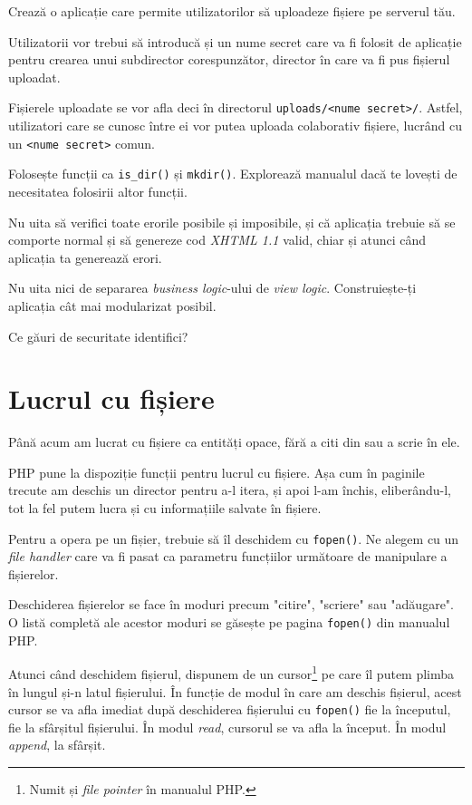 \begin{Exercise}[title={Remote file storage},difficulty=2]
\ExePart

Crează o aplicație care permite utilizatorilor să
uploadeze fișiere pe serverul tău.

Utilizatorii vor trebui să introducă și un nume secret
care va fi folosit de aplicație pentru crearea unui subdirector
corespunzător, director în care va fi pus fișierul uploadat.

Fișierele uploadate se vor afla deci în directorul
\texttt{uploads/<nume secret>/}. Astfel, utilizatori
care se cunosc între ei vor putea uploada colaborativ
fișiere, lucrând cu un \texttt{<nume secret>} comun.

Folosește funcții ca \texttt{is\_dir()} și
\texttt{mkdir()}. Explorează manualul dacă te
lovești de necesitatea folosirii altor funcții.

Nu uita să verifici toate erorile posibile și
imposibile, și că aplicația trebuie să
se comporte normal și să genereze cod \textit{XHTML 1.1} valid, chiar și atunci
când aplicația ta generează erori.

Nu uita nici de separarea \textit{business logic}-ului
de \textit{view logic}. Construiește-ți aplicația
cât mai modularizat posibil.

\ExePart
Ce găuri de securitate identifici?
\end{Exercise}

\section{Lucrul cu fișiere}
Până acum am lucrat cu fișiere ca entități opace, fără
a citi din sau a scrie în ele.

PHP pune la dispoziție funcții pentru lucrul
cu fișiere. Așa cum în paginile trecute am deschis un
director pentru a-l itera, și apoi l-am închis, eliberându-l,
tot la fel putem lucra și cu informațiile salvate în fișiere.

Pentru a opera pe un fișier, trebuie să îl deschidem cu
\texttt{fopen()}. Ne alegem cu un \textsl{file handler}
care va fi pasat ca parametru funcțiilor următoare
de manipulare a fișierelor.

Deschiderea fișierelor se face în moduri precum "citire",
"scriere" sau "adăugare". O listă completă ale acestor
moduri se găsește pe pagina \texttt{fopen()} din manualul
PHP.

Atunci când deschidem fișierul, dispunem de un cursor\footnote{Numit și
\textit{file pointer} în manualul PHP.}
pe care îl putem plimba în lungul și-n latul fișierului.
În funcție de modul în care am deschis fișierul, acest
cursor se va afla imediat după deschiderea
fișierului cu \texttt{fopen()} fie la începutul, fie la sfârșitul
fișierului. În modul \textit{read}, cursorul se va
afla la început. În modul \textit{append}, la sfârșit.

